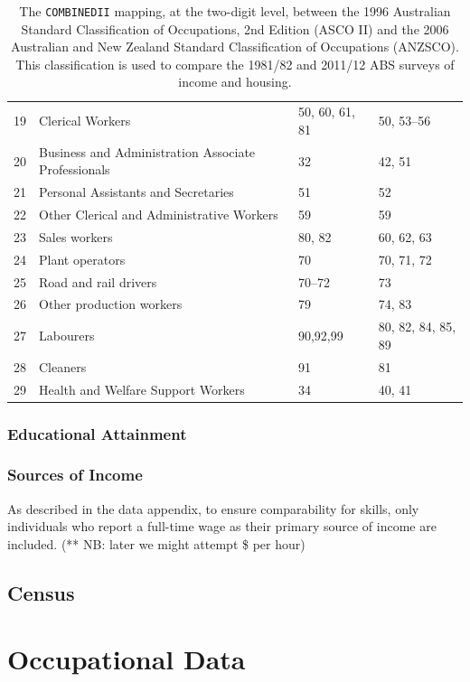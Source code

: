 \begin{table}
\begin{tabular}{clll}
  19 & Clerical Workers & 50, 60, 61, 81 & 50, 53--56 \\ 
  20 & Business and Administration Associate Professionals & 32 & 42, 51 \\ 
  21 & Personal Assistants and Secretaries & 51 & 52 \\ 
  22 & Other Clerical and Administrative Workers & 59 & 59 \\ 
  23 & Sales workers & 80, 82 & 60, 62, 63 \\ 
  24 & Plant operators & 70 & 70, 71, 72 \\ 
  25 & Road and rail drivers & 70--72 & 73 \\ 
  26 & Other production workers & 79 & 74, 83 \\ 
  27 & Labourers & 90,92,99 & 80, 82, 84, 85, 89 \\ 
  28 & Cleaners & 91 & 81 \\ 
  29 & Health and Welfare Support Workers & 34 & 40, 41 \\ 
   \hline
\end{tabular}
\caption{The {\tt COMBINEDII} mapping, at the two-digit level, between the 1996 Australian Standard Classification of Occupations, 2nd Edition (ASCO II) and the 2006 Australian and New Zealand Standard Classification of Occupations (ANZSCO). This classification is used to compare the 1981/82 and 2011/12 ABS surveys of income and housing.}
\label{tab:combined2}
\end{table}

\subsubsection{Educational Attainment}


\subsubsection{Sources of Income}

As described in the data appendix, to ensure comparability for skills, only individuals who report a full-time wage as their primary source of income are included. (** NB: later we might attempt \$ per hour)



\subsection{Census}

\section{Occupational Data}
\label{sec:occclassify}

